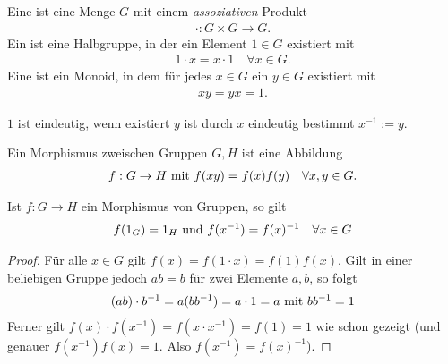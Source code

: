 \begin{definition}
	Eine  ist eine Menge $G$ mit einem \emph{assoziativen} Produkt
	\begin{align*}
		\cdot\colon G \times G \to G.
	\end{align*}
	Ein  ist eine Halbgruppe, in der ein Element $1 \in G$ existiert mit 
	\begin{align*}
		1\cdot x = x\cdot 1 \quad\forall x \in G.
	\end{align*}
	Eine  ist ein Monoid, in dem für jedes $x \in G$ ein $y \in G$ existiert mit
	\begin{align*}
		xy = yx = 1.
	\end{align*}
\end{definition}
\begin{remark} %
		$1$ ist eindeutig, wenn existiert $y$ ist durch $x$ eindeutig bestimmt $x^{-1} :=y$. %
\end{remark}
\begin{definition}[Morphismus]
	Ein Morphismus zweischen Gruppen $G,H$ ist eine Abbildung
	\begin{align*}
		f: G \to H \mit f(xy) = f(x)f(y) \quad\forall x,y \in G.
	\end{align*}
\end{definition}
\begin{proposition}
	Ist $f: G \to H$ ein Morphismus von Gruppen, so gilt
	\begin{align*}
		f(1_G) = 1_H \und f(x^{-1}) = f(x)^{-1} \quad \forall x \in G
	\end{align*}
\end{proposition}
\begin{proof}
	Für alle $x \in G$ gilt $f(x) = f(1\cdot x) = f(1)f(x)$. Gilt in einer beliebigen Gruppe jedoch $ab=b$ für zwei Elemente $a,b$, so folgt %
	\begin{align*}
		(ab)\cdot b^{-1} = a(bb^{-1}) = a\cdot 1 = a \mit bb^{-1} = 1
	\end{align*}
	Ferner gilt $f(x)\cdot f(x^{-1}) = f(x \cdot x^{-1}) = f(1) = 1$ wie schon gezeigt (und genauer $f(x^{-1})f(x) = 1$. Also $f(x^{-1}) = f(x)^{-1}$).
\end{proof}
